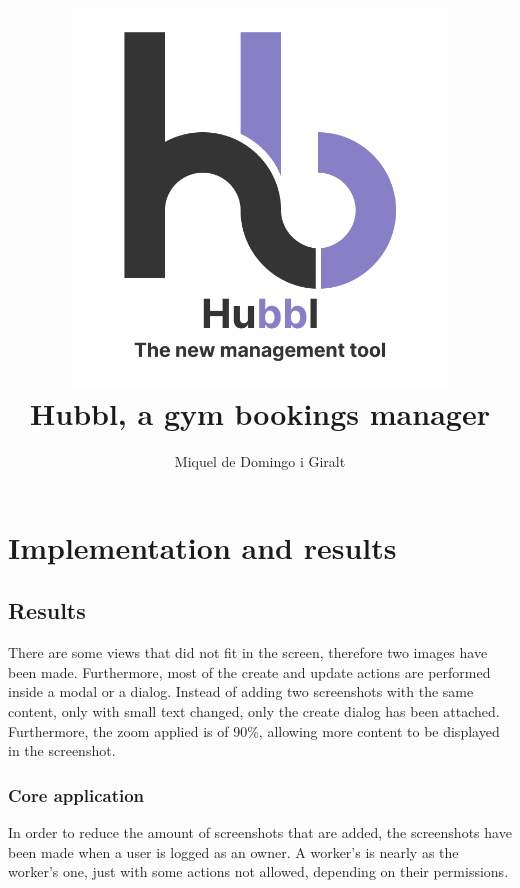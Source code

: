\documentclass[a4paper, 12pt, oneside]{book}
\title{
	\includegraphics[width=0.75\textwidth]{assets/logo.png}
	\\
	{\huge Hubbl, a gym bookings manager}
}
\author{Miquel de Domingo i Giralt}
\begin{document}
\frontmatter
\maketitle
\listoffigures
\mainmatter
\chapter{Implementation and results}
\section{Results}
There are some views that did not fit in the screen, therefore two images have been made. Furthermore, most of the create and update actions are performed inside a modal or a dialog. Instead of adding two screenshots with the same content, only with small text changed, only the create dialog has been attached. Furthermore, the zoom applied is of 90\%, allowing more content to be displayed in the screenshot.
\subsection{Core application}
In order to reduce the amount of screenshots that are added, the screenshots have been made when a user is logged as an owner. A worker's is nearly as the worker's one, just with some actions not allowed, depending on their permissions.
\end{document}
